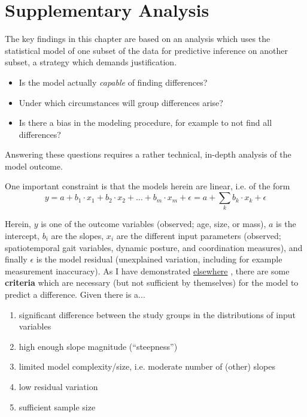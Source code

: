 \section{Supplementary Analysis}\label{supp:linearmodels}
\begin{change}
The key findings in this chapter are based on an analysis which uses the statistical model of one subset of the data for predictive inference on another subset, a strategy which demands justification.
\begin{itemize}
\item Is the model actually \textit{capable} of finding differences?
\item Under which circumstances will group differences arise?
\item Is there a bias in the modeling procedure, for example to not find all differences?
\end{itemize}
Answering these questions requires a rather technical, in-depth analysis of the model outcome.

One important constraint is that the models herein are linear, i.e. of the form
\[y = a + b_1 \cdot x_1 + b_2 \cdot x_2 + \ldots + b_m \cdot x_m + \epsilon = a + \sum\limits_k b_k \cdot x_k + \epsilon\]

Herein, \(y\) is one of the outcome variables (observed; age, size, or mass), \(a\) is the intercept, \(b_i\) are the slopes, \(x_i\) are the different input parameters (observed; spatiotemporal gait variables, dynamic posture, and coordination measures), and finally \(\epsilon\) is the model residual (unexplained variation, including for example measurement inaccuracy).
As I have demonstrated \href{http://mielke-bio.info/falk/posts/33.linearmodels}{elsewhere} \citep{Mielke2024lm}, there are some \textbf{criteria} which are necessary (but not sufficient by themselves) for the model to predict a difference.
Given there is a...
\begin{enumerate}
\item significant difference between the study groups in the distributions of input variables
\item high enough slope magnitude (``steepness'')
\item limited model complexity/size, i.e. moderate number of (other) slopes
\item low residual variation
\item sufficient sample size
\end{enumerate}


\end{change}
